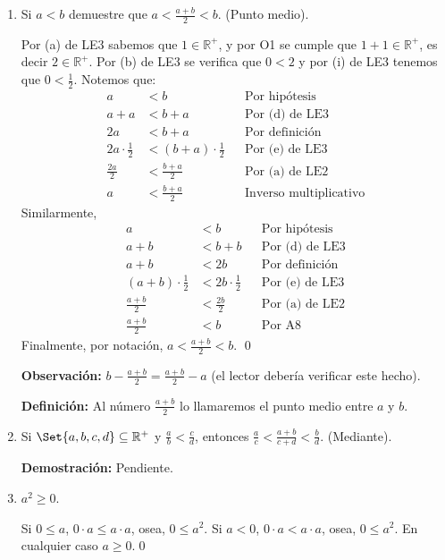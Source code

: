 \documentclass[11pt]{article}
\newcommand{\R}{\mathbb{R}}
\let\set\Set
\begin{document}
\begin{enumerate}[label=\alph*)]
    \item Si $a<b$ demuestre que $a<\frac{a+b}{2}<b$. (Punto medio).
    
    Por (a) de LE3 sabemos que $1 \in \R^+$, y por O1 se cumple que $1+1 \in \R^+$, es decir $2 \in \R^+$. Por (b) de LE3 se verifica que $0<2$ y por (i) de LE3 tenemos que $0<\frac{1}{2}$. Notemos que: \begin{align*}
        a &< b && \text{Por hipótesis} \\
        a + a &< b+a && \text{Por (d) de LE3} \\
        2a &< b+a && \text{Por definición} \\
        2a \cdot \frac{1}{2} &< (b+a) \cdot \frac{1}{2} && \text{Por (e) de LE3} \\
        \frac{2a}{2} &< \frac{b+a}{2} && \text{Por (a) de LE2} \\
        a &< \frac{b+a}{2} && \text{Inverso multiplicativo}
    \end{align*} Similarmente,
    \begin{align*}
        a &< b && \text{Por hipótesis} \\
        a + b &< b+b && \text{Por (d) de LE3} \\
        a +b &< 2b && \text{Por definición} \\
        (a+b) \cdot \frac{1}{2} &< 2b \cdot \frac{1}{2} && \text{Por (e) de LE3} \\
        \frac{a+b}{2} &< \frac{2b}{2} && \text{Por (a) de LE2} \\
        \frac{a+b}{2} &< b && \text{Por A8}
    \end{align*} Finalmente, por notación, $a < \frac{a+b}{2} < b$. \qed

    \textbf{Observación:} $b-\frac{a+b}{2} = \frac{a+b}{2}-a$ (el lector debería verificar este hecho).

    \textbf{Definición:} Al número $\frac{a+b}{2}$ lo llamaremos el punto medio entre $a$ y $b$.

    \item Si $\set{a,b,c,d} \subseteq \R^+$ y $\frac{a}{b}<\frac{c}{d}$, entonces $\frac{a}{c}<\frac{a+b}{c+d}<\frac{b}{d}$. (Mediante).
    
    \textbf{Demostración:} Pendiente.

    \item $a^2\geq 0$.
    
    Si $0 \leq a$, $ 0\cdot a \leq a \cdot a$, osea, $0 \leq a^2$. Si $a<0$, $0\cdot a < a \cdot a$, osea, $0 \leq a^2$. En cualquier caso $a\geq0$.\qed


\end{enumerate}
\end{document}
